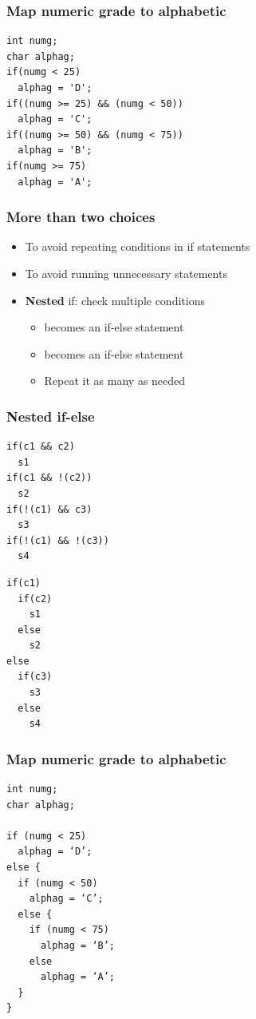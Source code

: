 \documentclass{../c-lecture}
\begin{document}
\begin{frame}[fragile]
  \frametitle{Map numeric grade to alphabetic}
  \begin{verbatim}
int numg;
char alphag;
if(numg < 25)
  alphag = 'D';
if((numg >= 25) && (numg < 50))
  alphag = 'C';
if((numg >= 50) && (numg < 75))
  alphag = 'B';
if(numg >= 75)
  alphag = 'A';
  \end{verbatim}
\end{frame}

\begin{frame}
  \frametitle{More than two choices}
  \begin{itemize}
    \item To avoid repeating conditions in if statements
    \item To avoid running unnecessary statements
    \item \textbf{\color{RubineRed} Nested} if: check multiple conditions
    \begin{itemize}
      \item <Statements 1> becomes an if-else statement
      \item <Statements 2> becomes an if-else statement
      \item Repeat it as many as needed
    \end{itemize}
  \end{itemize}
\end{frame}

\begin{frame}[fragile]
  \frametitle{Nested if-else}
  \begin{verbatim}
if(c1 && c2)
  s1
if(c1 && !(c2))
  s2
if(!(c1) && c3)
  s3
if(!(c1) && !(c3))
  s4
  \end{verbatim}
  \begin{verbatim}
if(c1)
  if(c2)
    s1
  else
    s2
else
  if(c3)
    s3
  else
    s4
  \end{verbatim}
\end{frame}

\begin{frame}[fragile]
  \frametitle{Map numeric grade to alphabetic}
  \begin{verbatim}
int numg;
char alphag;

if (numg < 25)
  alphag = ‘D’;
else {
  if (numg < 50)
    alphag = ‘C’;
  else {
    if (numg < 75)
      alphag = ‘B’;
    else
      alphag = ‘A’;
  }
}
  \end{verbatim}
\end{frame}
\end{document}

